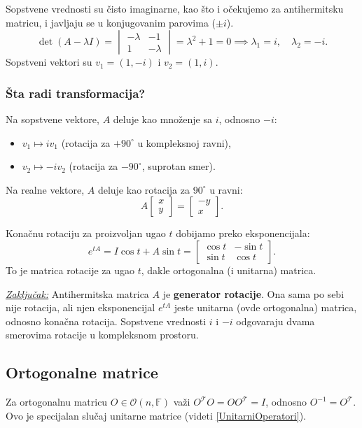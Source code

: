 \documentclass[a4paper,12pt,twoside]{report}
\numberwithin{algorithm}{section}
\begin{document}
Sopstvene vrednosti su čisto imaginarne, kao što i očekujemo za antihermitsku matricu, i javljaju se u konjugovanim parovima ($\pm i$).
\[
\det(A - \lambda I) = \begin{vmatrix} -\lambda & -1 \\ 1 & -\lambda \end{vmatrix} = \lambda^2 + 1 = 0
\implies \lambda_1 = i, \quad \lambda_2 = -i.
\]
Sopstveni vektori su $v_1 = (1, -i)$ i $v_2 = (1, i)$.

\newpage
\subsubsection*{Šta radi transformacija?}

Na sopstvene vektore, $A$ deluje kao množenje sa $i$, odnosno $-i$:
\begin{itemize}
    \item $v_1 \mapsto i v_1$ (rotacija za $+90^\circ$ u kompleksnoj ravni),
    \item $v_2 \mapsto -i v_2$ (rotacija za $-90^\circ$, suprotan smer).
\end{itemize}

Na realne vektore, $A$ deluje kao rotacija za $90^\circ$ u ravni:
\[
A \begin{bmatrix} x \\ y \end{bmatrix} = \begin{bmatrix} -y \\ x \end{bmatrix}.
\]

Konačnu rotaciju za proizvoljan ugao $t$ dobijamo preko eksponencijala:
\[
e^{tA} = I\cos t + A\sin t = \begin{bmatrix} \cos t & -\sin t \\ \sin t & \cos t \end{bmatrix}.
\]
To je matrica rotacije za ugao $t$, dakle ortogonalna (i unitarna) matrica.

\medskip
\noindent\underline{\textit{Zaključak:}} Antihermitska matrica $A$ je \textbf{generator rotacije}. Ona sama po sebi nije rotacija, ali njen eksponencijal $e^{tA}$ jeste unitarna (ovde ortogonalna) matrica, odnosno konačna rotacija. Sopstvene vrednosti $i$ i $-i$ odgovaraju dvama smerovima rotacije u kompleksnom prostoru.

\newpage

\subsection{Ortogonalne matrice}
\label{OrtogonalneMatrice}
Za ortogonalnu matricu $O \in \mathcal{O}(n, \mathbb{F})$ važi $O^\mathcal{T} O = O O^\mathcal{T} = I$, odnosno $O^{-1} = O^\mathcal{T}$. Ovo je specijalan slučaj unitarne matrice (videti \ref{UnitarniOperatori}).
\end{document}
